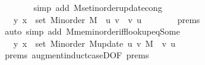 \begin{isabellebody}
\ \ \ \ \ \ \isamarkupfalse%
\ {\isacharparenleft}{\kern0pt}simp\ add{\isacharcolon}{\kern0pt}\ M{\isachardot}{\kern0pt}set{\isacharunderscore}{\kern0pt}inorder{\isacharunderscore}{\kern0pt}update{\isacharunderscore}{\kern0pt}cong{\isacharparenright}{\kern0pt}\isanewline
\ \ \ \ \isamarkupfalse%
\ \isamarkupfalse%
\ {\isachardoublequoteopen}{\isachardot}{\kern0pt}{\isachardot}{\kern0pt}{\isachardot}{\kern0pt}\ {\isasymlongleftrightarrow}\ {\isacharparenleft}{\kern0pt}y{\isacharcomma}{\kern0pt}\ x{\isacharparenright}{\kern0pt}\ {\isasymin}\ set\ {\isacharparenleft}{\kern0pt}M{\isacharunderscore}{\kern0pt}inorder\ M{\isacharparenright}{\kern0pt}\ {\isasymunion}\ {\isacharbraceleft}{\kern0pt}{\isacharparenleft}{\kern0pt}u{\isacharcomma}{\kern0pt}\ v{\isacharparenright}{\kern0pt}{\isacharbraceright}{\kern0pt}\ {\isasymunion}\ {\isacharbraceleft}{\kern0pt}{\isacharparenleft}{\kern0pt}v{\isacharcomma}{\kern0pt}\ u{\isacharparenright}{\kern0pt}{\isacharbraceright}{\kern0pt}{\isachardoublequoteclose}\isanewline
\ \ \ \ \ \ \isamarkupfalse%
\ {\isachardoublequoteopen}{}{\isachardot}{\kern0pt}prems{\isachardoublequoteclose}{\isacharparenleft}{\kern0pt}{}{\isacharcomma}{\kern0pt}\ {}{\isacharparenright}{\kern0pt}\isanewline
\ \ \ \ \ \ \isamarkupfalse%
\ {\isacharparenleft}{\kern0pt}auto\ simp\ add{\isacharcolon}{\kern0pt}\ M{\isachardot}{\kern0pt}mem{\isacharunderscore}{\kern0pt}inorder{\isacharunderscore}{\kern0pt}iff{\isacharunderscore}{\kern0pt}lookup{\isacharunderscore}{\kern0pt}eq{\isacharunderscore}{\kern0pt}Some{\isacharparenright}{\kern0pt}\isanewline
\ \ \ \ \isamarkupfalse%
\ \isamarkupfalse%
\ {\isachardoublequoteopen}{\isachardot}{\kern0pt}{\isachardot}{\kern0pt}{\isachardot}{\kern0pt}\ {\isasymlongleftrightarrow}\ {\isacharparenleft}{\kern0pt}y{\isacharcomma}{\kern0pt}\ x{\isacharparenright}{\kern0pt}\ {\isasymin}\ set\ {\isacharparenleft}{\kern0pt}M{\isacharunderscore}{\kern0pt}inorder\ {\isacharparenleft}{\kern0pt}M{\isacharunderscore}{\kern0pt}update\ u\ v\ M{\isacharparenright}{\kern0pt}{\isacharparenright}{\kern0pt}\ {\isasymunion}\ {\isacharbraceleft}{\kern0pt}{\isacharparenleft}{\kern0pt}v{\isacharcomma}{\kern0pt}\ u{\isacharparenright}{\kern0pt}{\isacharbraceright}{\kern0pt}{\isachardoublequoteclose}\isanewline
\ \ \ \ \ \ \isamarkupfalse%
\ {\isachardoublequoteopen}{}{\isachardot}{\kern0pt}prems{\isachardoublequoteclose}{\isacharparenleft}{\kern0pt}{}{\isacharparenright}{\kern0pt}\ augment{\isacharunderscore}{\kern0pt}induct{\isacharunderscore}{\kern0pt}case{\isacharunderscore}{\kern0pt}{}D{\isacharparenleft}{\kern0pt}{}{\isacharparenright}{\kern0pt}{\isacharbrackleft}{\kern0pt}OF\ {\isachardoublequoteopen}{}{\isachardot}{\kern0pt}prems{\isachardoublequoteclose}{\isacharbrackright}{\kern0pt}\isanewline

\end{isabellebody}
